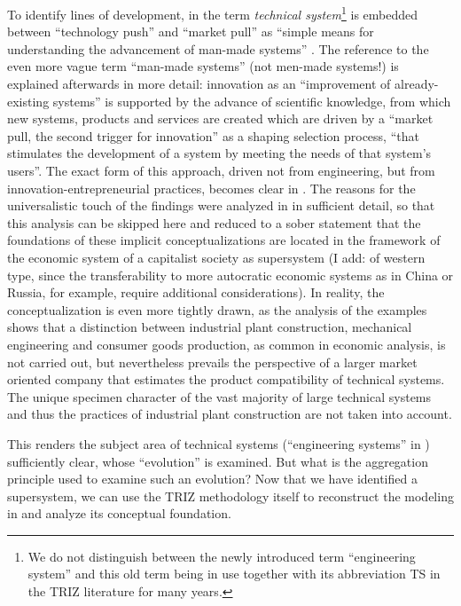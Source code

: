 \documentclass[11pt,a4paper]{article}
\begin{document}
To identify lines of development, in \cite{TESE2018} the term \emph{technical
  system}\footnote{We do not distinguish between the newly introduced term
  ``engineering system'' and this old term being in use together with its
  abbreviation TS in the TRIZ literature for many years.} is embedded between
``technology push'' and ``market pull'' as ``simple means for understanding
the advancement of man-made systems'' \cite[p. 1]{TESE2018}. The reference to
the even more vague term ``man-made systems'' (not men-made systems!) is
explained afterwards in more detail: innovation as an ``improvement of
already-existing systems'' is supported by the advance of scientific
knowledge, from which new systems, products and services are created which are
driven by a ``market pull, the second trigger for innovation'' as a shaping
selection process, ``that stimulates the development of a system by meeting
the needs of that system's users''. The exact form of this approach, driven
not from engineering, but from innovation-entrepreneurial practices, becomes
clear in \cite[Chapter 3]{TESE2018}. The reasons for the universalistic touch
of the findings were analyzed in \cite{Gerovitch1996} in sufficient detail, so
that this analysis can be skipped here and reduced to a sober statement that
the foundations of these implicit conceptualizations are located in the
framework of the economic system of a capitalist society as supersystem (I
add: of western type, since the transferability to more autocratic economic
systems as in China or Russia, for example, require additional
considerations).  In reality, the conceptualization is even more tightly
drawn, as the analysis of the examples shows that a distinction between
industrial plant construction, mechanical engineering and consumer goods
production, as common in economic analysis, is not carried out, but
nevertheless prevails the perspective of a larger market oriented company that
estimates the product compatibility of technical systems.  The unique specimen
character of the vast majority of large technical systems and thus the
practices of industrial plant construction are not taken into account.

This renders the subject area of technical systems (``engineering systems'' in
\cite{TESE2018}) sufficiently clear, whose ``evolution'' is examined.  But
what is the aggregation principle used to examine such an evolution? Now that
we have identified a supersystem, we can use the TRIZ methodology itself to
reconstruct the modeling in \cite{TESE2018} and analyze its conceptual
foundation.
\end{document}
